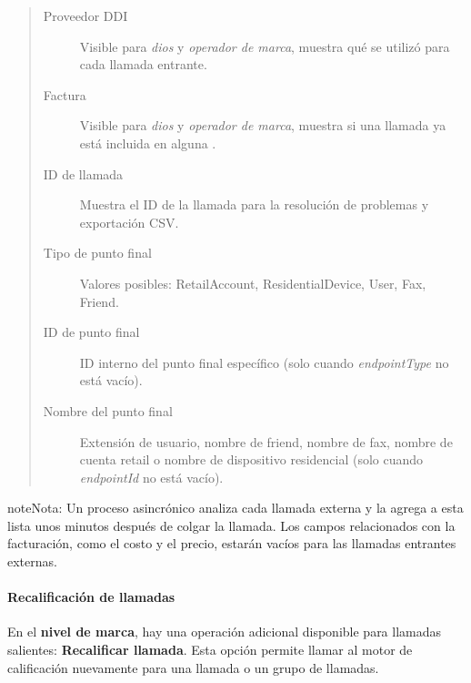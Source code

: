 \documentclass[letterpaper,10pt,spanish]{sphinxmanual}
\begin{document}
\begin{quote}
\begin{description}
\item[{Proveedor DDI}] \leavevmode
Visible para \emph{dios} y \emph{operador de marca}, muestra qué {\hyperref[administration_portal/brand/providers/ddi_providers:ddi\string-providers]{}} se utilizó para cada llamada entrante.

\item[{Factura}] \leavevmode
Visible para \emph{dios} y \emph{operador de marca}, muestra si una llamada ya está incluida en alguna {\hyperref[administration_portal/brand/invoicing/invoices:invoices]{}}.

\item[{ID de llamada}] \leavevmode
Muestra el ID de la llamada para la resolución de problemas y exportación CSV.

\item[{Tipo de punto final}] \leavevmode
Valores posibles: RetailAccount, ResidentialDevice, User, Fax, Friend.

\item[{ID de punto final}] \leavevmode
ID interno del punto final específico (solo cuando \emph{endpointType} no está vacío).

\item[{Nombre del punto final}] \leavevmode
Extensión de usuario, nombre de friend, nombre de fax, nombre de cuenta retail o nombre de dispositivo residencial (solo cuando \emph{endpointId} no está vacío).

\end{description}
\end{quote}

\begin{notice}{note}{Nota:}
Un proceso asincrónico analiza cada llamada externa y la agrega a esta lista unos minutos después de colgar la llamada. Los campos relacionados con la facturación, como el costo y el precio, estarán vacíos para las llamadas entrantes externas.
\end{notice}


\paragraph{Recalificación de llamadas}
\label{administration_portal/client/wholesale/calls/external_calls:call-rerating}
En el \textbf{nivel de marca}, hay una operación adicional disponible para llamadas salientes: \textbf{Recalificar llamada}. Esta opción permite llamar al motor de calificación nuevamente para una llamada o un grupo de llamadas.
\end{document}
